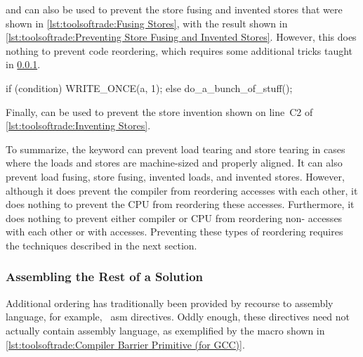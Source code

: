  and  can also be used to prevent the
store fusing and invented stores that were shown in
\cref{lst:toolsoftrade:Fusing Stores},
with the result shown in
\cref{lst:toolsoftrade:Preventing Store Fusing and Invented Stores}.
However, this does nothing to prevent code reordering, which requires
some additional tricks taught in
\cref{sec:toolsoftrade:Assembling the Rest of a Solution}.

\begin{listing}
\begin{fcvlabel}
\begin{VerbatimL}[commandchars=\\\{\}]
if (condition)
	WRITE_ONCE(a, 1);
else
	do_a_bunch_of_stuff();
\end{VerbatimL}
\end{fcvlabel}
\caption{Disinviting an Invented Store}
\label{lst:toolsoftrade:Disinviting an Invented Store}
\end{listing}

Finally,  can be used to prevent the store invention
shown on line~C2 of
\cref{lst:toolsoftrade:Inventing Stores}.

To summarize, the  keyword can prevent load
tearing and store tearing in cases where the loads and stores are
machine-sized and properly aligned.
It can also prevent load fusing, store fusing, invented loads, and
invented stores.
However, although it does prevent the compiler from reordering 
accesses with each other, it does nothing to prevent the
CPU from reordering these accesses.
Furthermore, it does nothing to prevent either compiler or CPU from
reordering non- accesses with each other or with
 accesses.
Preventing these types of reordering requires the techniques described
in the next section.

\subsubsection{Assembling the Rest of a Solution}
\label{sec:toolsoftrade:Assembling the Rest of a Solution}

Additional ordering has traditionally been provided by recourse to
assembly language, for example, \GCC\ asm directives.
Oddly enough, these directives need not actually contain assembly language,
as exemplified by the  macro shown in
\cref{lst:toolsoftrade:Compiler Barrier Primitive (for GCC)}.

